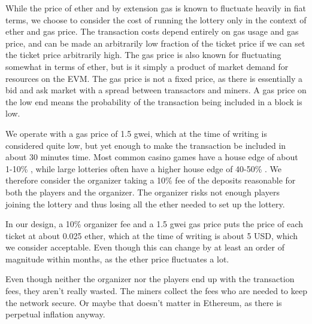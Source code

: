 While the price of ether and by extension gas is known to fluctuate heavily in fiat terms, we choose to consider the cost of running the lottery only in the context of ether and gas price. The transaction costs depend entirely on gas usage and gas price, and can be made an arbitrarily low fraction of the ticket price if we can set the ticket price arbitrarily high. The gas price is also known for fluctuating somewhat in terms of ether, but is it simply a product of market demand for resources on the EVM. The gas price is not a fixed price, as there is essentially a bid and ask market with a spread between transactors and miners. A gas price on the low end means the probability of the transaction being included in a block is low. 

We operate with a gas price of 1.5 gwei, which at the time of writing is considered quite low, but yet enough to make the transaction be included in about 30 minutes time. Most common casino games have a house edge of about 1-10\% \cite{walsh_houses_nodate}, while large lotteries often have a higher house edge of 40-50\% \cite{shackleford_house_nodate}. We therefore consider the organizer taking a 10\% fee of the deposits reasonable for both the players and the organizer. The organizer risks not enough players joining the lottery and thus losing all the ether needed to set up the lottery. 

In our design, a 10\% organizer fee and a 1.5 gwei gas price puts the price of each ticket at about 0.025 ether, which at the time of writing is about 5 USD, which we consider acceptable. Even though this can change by at least an order of magnitude within months, as the ether price fluctuates a lot. 

Even though neither the organizer nor the players end up with the transaction fees, they aren't really wasted. The miners collect the fees who are needed to keep the network secure. Or maybe that doesn't matter in Ethereum, as there is perpetual inflation anyway.